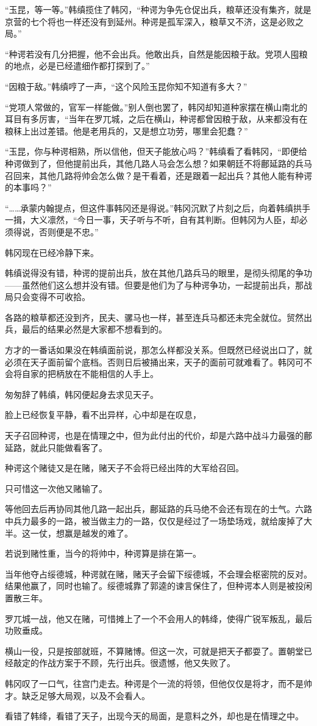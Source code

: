 “玉昆，等一等。”韩缜揽住了韩冈，“种谔为争先仓促出兵，粮草还没有集齐，就是京营的七个将也一样还没有到延州。种谔是孤军深入，粮草又不济，这是必败之局。”

“种谔若没有几分把握，他不会出兵。他敢出兵，自然是能因粮于敌。党项人囤粮的地点，必是已经遣细作都打探到了。”

“因粮于敌。”韩缜哼了一声，“这个风险玉昆你知不知道有多大？”

“党项人常做的，官军一样能做。”别人倒也罢了，韩冈却知道种家摆在横山南北的耳目有多厉害，“当年在罗兀城，之后在横山，种谔都曾因粮于敌，从来都没有在粮秣上出过差错。他是老用兵的，又是想立功劳，哪里会犯蠢？”

“玉昆，你与种谔相熟，所以信他，但天子能放心吗？”韩缜看了看韩冈，“即便给种谔做到了，但他提前出兵，其他几路人马会怎么想？如果朝廷不将鄜延路的兵马召回来，其他几路将帅会怎么做？是干看着，还是跟着一起出兵？其他人能有种谔的本事吗？”

“……承蒙内翰提点，但这件事韩冈还是得说。”韩冈沉默了片刻之后，向着韩缜拱手一揖，大义凛然，“今日一事，天子听与不听，自有其判断。但韩冈为人臣，却必须得说，否则便是不忠。”

韩冈现在已经冷静下来。

韩缜说得没有错，种谔的提前出兵，放在其他几路兵马的眼里，是彻头彻尾的争功——虽然他们这么想并没有错。但要是他们为了与种谔争功，一起提前出兵，那战局只会变得不可收拾。

各路的粮草都还没到齐，民夫、骡马也一样，甚至连兵马都还未完全就位。贸然出兵，最后的结果必然是大家都不想看到的。

方才的一番话如果没在韩缜面前说，那怎么样都没关系。但既然已经说出口了，就必须在天子面前留个底档。否则日后被捅出来，天子的面前可就难看了。韩冈可不会将自家的把柄放在不能相信的人手上。

匆匆辞了韩缜，韩冈便起身去求见天子。

脸上已经恢复平静，看不出异样，心中却是在叹息，

天子召回种谔，也是在情理之中，但为此付出的代价，却是六路中战斗力最强的鄜延路，就此只能做看客了。

种谔这个赌徒又是在赌，赌天子不会将已经出阵的大军给召回。

只可惜这一次他又赌输了。

等他回去后再协同其他几路一起出兵，鄜延路的兵马绝不会还有现在的士气。六路中兵力最多的一路，被当做主力的一路，仅仅是经过了一场垫场戏，就给废掉了大半。这一仗，想赢是越发的难了。

若说到赌性重，当今的将帅中，种谔算是排在第一。

当年他夺占绥德城，种谔就在赌，赌天子会留下绥德城，不会理会枢密院的反对。结果他赢了，同时也输了。绥德城靠了郭逵的谏言保住了，但种谔本人则是被投闲置散三年。

罗兀城一战，他又在赌，可惜摊上了一个不会用人的韩绛，使得广锐军叛乱，最后功败垂成。

横山一役，只是按部就班，不算赌博。但这一次，可就是把天子都耍了。置朝堂已经敲定的作战方案于不顾，先行出兵。很遗憾，他又失败了。

韩冈叹了一口气，往宫门走去。种谔是个一流的将领，但他仅仅是将才，而不是帅才。缺乏足够大局观，以及不会看人。

看错了韩绛，看错了天子，出现今天的局面，是意料之外，却也是在情理之中。


